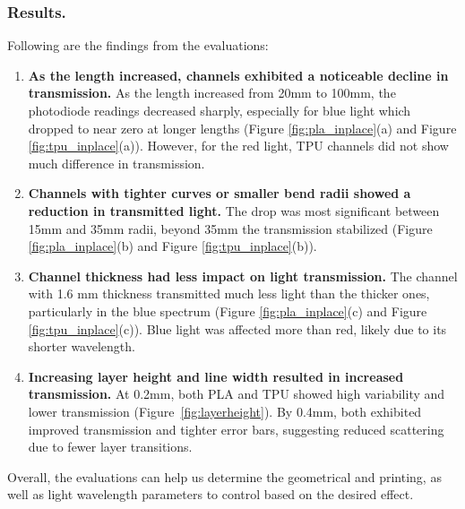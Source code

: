 \subsubsection{Results.} Following are the findings from the evaluations:
\label{sec:results}

\begin{enumerate}[noitemsep, leftmargin=*]
    \item\textbf{ As the length increased, channels exhibited a noticeable decline in transmission.}
As the length increased from 20mm to 100mm, the photodiode readings decreased sharply, especially for blue light which dropped to near zero at longer lengths (Figure \ref{fig:pla_inplace}(a) and Figure \ref{fig:tpu_inplace}(a)). However, for the red light, TPU channels did not show much difference in transmission.

\item \textbf{Channels with tighter curves or smaller bend radii showed a reduction in transmitted light.}
The drop was most significant between 15mm and 35mm radii, beyond 35mm the transmission stabilized (Figure \ref{fig:pla_inplace}(b) and Figure \ref{fig:tpu_inplace}(b)). 

\item \textbf{Channel thickness had less impact on light transmission.} 
The channel with 1.6 mm thickness transmitted much less light than the thicker ones, particularly in the blue spectrum (Figure \ref{fig:pla_inplace}(c) and Figure \ref{fig:tpu_inplace}(c)). Blue light was affected more than red, likely due to its shorter wavelength.

\item \textbf{Increasing layer height and line width resulted in increased transmission.} At 0.2mm, both PLA and TPU showed high variability and lower transmission (Figure~\ref{fig:layerheight}). By 0.4mm, both exhibited improved transmission and tighter error bars, suggesting reduced scattering due to fewer layer transitions.

\end{enumerate}


Overall, the evaluations can help us determine the geometrical and printing, as well as light wavelength parameters to control based on the desired effect.


